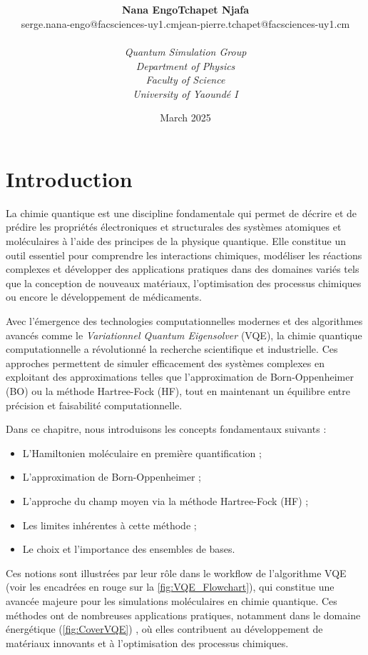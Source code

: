 \documentclass[12pt,a4paper]{article} %
\title{\vspace*{4cm}
\Huge\tcb{Chapter 1 - Quantum Chemistry Modelling Basis}
\vspace*{5cm}}
\author{
\begin{tabular}{lr}
    \textbf{Nana Engo} & \textbf{Tchapet Njafa}\\
    {\small  serge.nana-engo@facsciences-uy1.cm} &\hspace*{2em}
    {\small jean-pierre.tchapet@facsciences-uy1.cm}
\end{tabular}\\[3em] %
\textit{Quantum Simulation Group}\\
    \textit{Department of Physics} \\ 
    \textit{Faculty of Science} \\ 
    \textit{University of Yaoundé I}
}
\date{\vspace*{3cm}March 2025} %
\numberwithin{equation}{section} %
\numberwithin{figure}{section} %
\numberwithin{table}{section} %
\begin{document}
\maketitle %

\newpage
\section{Introduction}

La chimie quantique est une discipline fondamentale qui permet de décrire et de prédire les propriétés électroniques et structurales des systèmes atomiques et moléculaires à l'aide des principes de la physique quantique. Elle constitue un outil essentiel pour comprendre les interactions chimiques, modéliser les réactions complexes et développer des applications pratiques dans des domaines variés tels que la conception de nouveaux matériaux, l'optimisation des processus chimiques ou encore le développement de médicaments.

Avec l'émergence des technologies computationnelles modernes et des algorithmes avancés comme le \emph{Variationnel Quantum Eigensolver} (VQE), la chimie quantique computationnelle a révolutionné la recherche scientifique et industrielle. Ces approches permettent de simuler efficacement des systèmes complexes en exploitant des approximations telles que l'approximation de Born-Oppenheimer (BO) ou la méthode Hartree-Fock (HF), tout en maintenant un équilibre entre précision et faisabilité computationnelle.

Dans ce chapitre, nous introduisons les concepts fondamentaux suivants :
\begin{itemize}
    \item L'Hamiltonien moléculaire en première quantification ;
    \item L'approximation de Born-Oppenheimer ;
    \item L'approche du champ moyen via la méthode Hartree-Fock (HF) ;
    \item Les limites inhérentes à cette méthode ;
    \item Le choix et l'importance des ensembles de bases.
\end{itemize}

Ces notions sont illustrées par leur rôle dans le workflow de l'algorithme VQE (voir les encadrées en rouge sur la \autoref{fig:VQE_Flowchart}), qui constitue une avancée majeure pour les simulations moléculaires en chimie quantique. Ces méthodes ont de nombreuses applications pratiques, notamment dans le domaine énergétique (\autoref{fig:CoverVQE}) , où elles contribuent au développement de matériaux innovants et à l'optimisation des processus chimiques.
\end{document}
